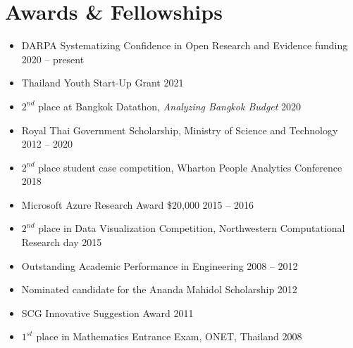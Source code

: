 \section{\sc Awards \& Fellowships}

\begin{itemize}[leftmargin=0cm, label={}]
\itemsep0em

\item DARPA Systematizing Confidence in Open Research and Evidence funding \hfill 2020 -- present

\item Thailand Youth Start-Up Grant \hfill 2021

\item $2^{nd}$ place at Bangkok Datathon, {\em Analyzing Bangkok Budget} \hfill 2020

\item Royal Thai Government Scholarship, Ministry of Science and Technology \hfill 2012 -- 2020

\item $2^{nd}$ place student case competition, Wharton People Analytics Conference \hfill 2018

\item Microsoft Azure Research Award \$20,000 \hfill 2015 -- 2016

\item $2^{nd}$ place in Data Visualization Competition, Northwestern Computational Research day \hfill 2015

\item Outstanding Academic Performance in Engineering	\hfill 2008 -- 2012

\item Nominated candidate for the Ananda Mahidol Scholarship \hfill 2012

\item SCG Innovative Suggestion Award	\hfill 2011

\item $1^{st}$ place in Mathematics Entrance Exam, ONET, Thailand \hfill 2008\\

\end{itemize}

